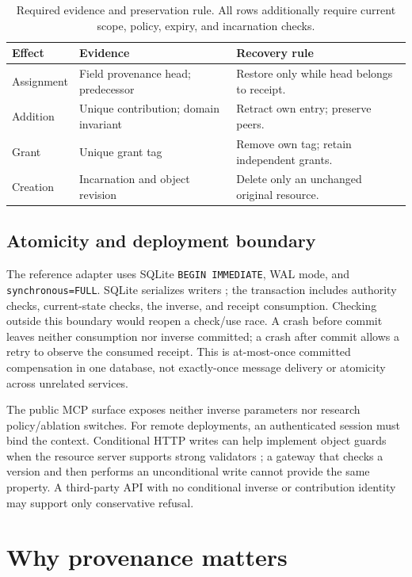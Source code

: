 \documentclass[10pt,twocolumn]{article}
\begin{document}
\begin{table}[t]
\centering\small
\caption{Required evidence and preservation rule. All rows additionally require current scope, policy, expiry, and incarnation checks.}
\label{tab:types}
\begin{tabular}{@{}L{.21\columnwidth}L{.29\columnwidth}L{.40\columnwidth}@{}}
\toprule Effect & Evidence & Recovery rule\\\midrule
Assignment & Field provenance head; predecessor & Restore only while head belongs to receipt.\\
Addition & Unique contribution; domain invariant & Retract own entry; preserve peers.\\
Grant & Unique grant tag & Remove own tag; retain independent grants.\\
Creation & Incarnation and object revision & Delete only an unchanged original resource.\\\bottomrule
\end{tabular}
\end{table}

\subsection{Atomicity and deployment boundary}
The reference adapter uses SQLite \texttt{BEGIN IMMEDIATE}, WAL mode, and \texttt{synchronous=FULL}. SQLite serializes writers \cite{sqlite}; the transaction includes authority checks, current-state checks, the inverse, and receipt consumption. Checking outside this boundary would reopen a check/use race. A crash before commit leaves neither consumption nor inverse committed; a crash after commit allows a retry to observe the consumed receipt. This is at-most-once committed compensation in one database, not exactly-once message delivery or atomicity across unrelated services.

The public MCP surface exposes neither inverse parameters nor research policy/ablation switches. For remote deployments, an authenticated session must bind the context. Conditional HTTP writes can help implement object guards when the resource server supports strong validators \cite{http}; a gateway that checks a version and then performs an unconditional write cannot provide the same property. A third-party API with no conditional inverse or contribution identity may support only conservative refusal.

\section{Why provenance matters}
\end{document}
